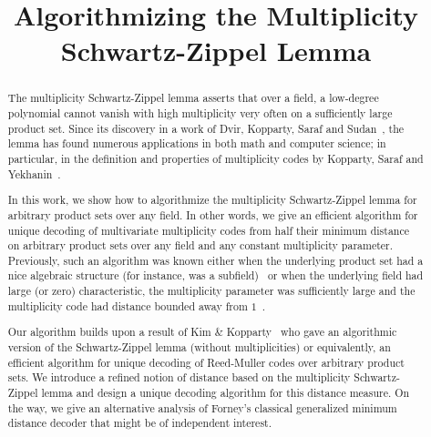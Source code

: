 \documentclass{theoretics}
\title{Algorithmizing the Multiplicity Schwartz-Zippel Lemma}
\begin{document}
	\maketitle
	
	\begin{abstract}
		The multiplicity Schwartz-Zippel lemma asserts that over a field, a
		low-degree polynomial cannot vanish with high multiplicity very
		often on a sufficiently large product set. Since its discovery in a
		work of Dvir, Kopparty, Saraf and Sudan~\cite{DvirKSS2013}, the
		lemma has found numerous applications in both math and computer
		science; in particular, in the definition and properties of
		multiplicity codes by Kopparty, Saraf and Yekhanin~\cite{KoppartySY2014}.
		
		In this work, we show how to algorithmize the multiplicity
		Schwartz-Zippel lemma for arbitrary product sets over any field. In
		other words, we give an efficient algorithm for unique decoding of
		multivariate multiplicity codes from half their minimum distance on
		arbitrary product sets over any field and any constant multiplicity parameter. Previously, such an
		algorithm was known either when the underlying product set had a nice
		algebraic structure (for instance, was a subfield)~\cite{Kopparty2015} or when the underlying field had large (or zero)
		characteristic, the multiplicity parameter was sufficiently large
		and the multiplicity code had distance bounded away from $1$~\cite{BhandariHKS2021-mgrid}. 
		
		Our algorithm builds upon a result of Kim \& Kopparty~\cite{KimK2017} who gave an algorithmic version of the
		Schwartz-Zippel lemma (without multiplicities) or equivalently, an
		efficient algorithm for unique decoding of Reed-Muller codes over
		arbitrary product sets. We introduce a refined notion of distance based on the multiplicity Schwartz-Zippel lemma and design a unique decoding algorithm
		for this distance measure. On the way, we give an alternative analysis of
		Forney's classical generalized minimum distance decoder that might
		be of independent interest.
		
	\end{abstract}
	
\end{document}
